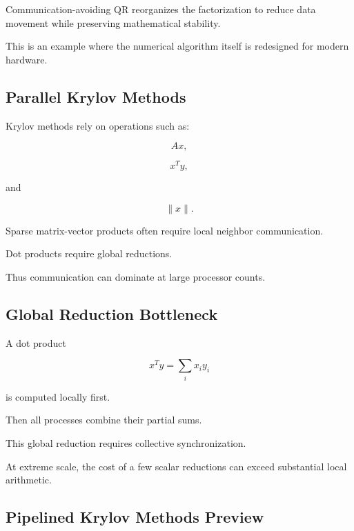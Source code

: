 Communication-avoiding QR reorganizes the factorization to reduce data
movement while preserving mathematical stability.

This is an example where the numerical algorithm itself is redesigned for
modern hardware.

\subsection{Parallel Krylov Methods}
\label{subsec:parallel-krylov-methods}

Krylov methods rely on operations such as:

\[
\boxed{
Ax,
}
\]

\[
\boxed{
x^Ty,
}
\]

and

\[
\boxed{
\|x\|.
}
\]

Sparse matrix-vector products often require local neighbor communication.

Dot products require global reductions.

Thus communication can dominate at large processor counts.

\subsection{Global Reduction Bottleneck}
\label{subsec:krylov-global-reduction}

A dot product

\[
x^Ty
=
\sum_i x_i y_i
\]

is computed locally first.

Then all processes combine their partial sums.

This global reduction requires collective synchronization.

At extreme scale, the cost of a few scalar reductions can exceed substantial
local arithmetic.

\subsection{Pipelined Krylov Methods Preview}
\label{subsec:pipelined-krylov}


